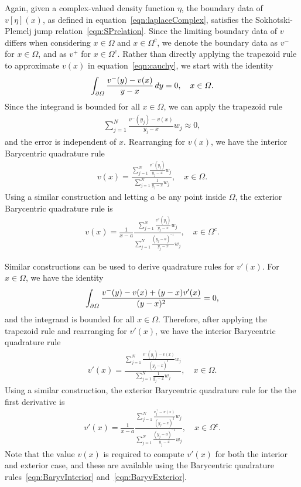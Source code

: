 \documentclass{jfm}
\begin{document}
Again, given a complex-valued density function $\eta$, the boundary data
of $v[\eta](x)$, as defined in equation~\eqref{eqn:laplaceComplex},
satisfies the Sokhotski-Plemelj jump relation~\eqref{eqn:SPrelation}.
Since the limiting boundary data of $v$ differs when considering $x \in
\Omega$ and $x \in \Omega^c$, we denote the boundary data as $v^-$ for
$x \in \Omega$, and as $v^+$ for $x \in \Omega^c$.  Rather than directly
applying the trapezoid rule to approximate $v(x)$ in
equation~\eqref{eqn:cauchy}, we start with the identity
\begin{align}
  \int_{{\partial}\varOmega} \frac{v^{-}(y) - v(x)}{y - x} \,dy = 0,
    \quad x \in \varOmega.
\end{align}
Since the integrand is bounded for all $x \in \Omega$, we can apply the
trapezoid rule
\begin{align}
  \sum_{j=1}^{N} \frac{v^{-}(y_j) - v(x)}{y_j - x} w_j \approx 0,
\end{align}
and the error is independent of $x$.  Rearranging for $v(x)$, we have
the interior Barycentric quadrature rule
\begin{align}
  v(x) = \frac{\sum\limits_{j=1}^N \frac{v^{-}(y_j)}{y_j - x} w_j}
  {\sum\limits_{j=1}^N \frac{1}{y_j - x} w_j}, \quad x \in \Omega.
  \label{eqn:BaryvInterior}
\end{align}
Using a similar construction and letting $a$ be any point inside
$\Omega$, the exterior Barycentric quadrature rule is
\begin{align}
  v(x) = \frac{1}{x-a} 
    \frac{\sum\limits_{j=1}^N \frac{v^+(y_j)}{y_j - x}w_j}
    {\sum\limits_{j=1}^N \frac{(y_j - a)^{-1}}{y_j - x}w_j},
    \quad x \in \Omega^c.
  \label{eqn:BaryvExterior}
\end{align}

Similar constructions can be used to derive quadrature rules
for $v'(x)$.  For $x \in \Omega$, we have the identity
\begin{align}
  \int_{{\partial}\varOmega} \frac{v^-(y) - v(x) + (y-x)v'(x)}{(y - x)^2} = 0,
\end{align}
and the integrand is bounded for all $x \in \Omega$.  Therefore, after
applying the trapezoid rule and rearranging for $v'(x)$, we have the
interior Barycentric quadrature rule
\begin{align}
  v'(x) = \frac{\sum\limits_{j=1}^{N}
    \frac{v^{-}(y_j) - v(x)}{(y_j-x)^2} w_j}
  {\sum\limits_{j=1}^{N} \frac{1}{y_j-x} w_j}, 
  \quad x \in \Omega.
  \label{eqn:BaryvprimeInterior}
\end{align}
Using a similar construction, the exterior Barycentric quadrature rule
for the the first derivative is
\begin{align}
  v'(x) = \frac{1}{x-a} \frac{\sum\limits_{j=1}^N
    \frac{v^+_j - v(x)}{(y_j - x)^2} w_j}
    {\sum\limits_{j=1}^N \frac{(y_j-a)^{-1}}{y_j - x} w_j},
    \quad x \in \Omega^c.
  \label{eqn:BaryvprimeExterior}
\end{align}
Note that the value $v(x)$ is required to compute $v'(x)$ for both the
interior and exterior case, and these are available using the
Barycentric quadrature rules~\eqref{eqn:BaryvInterior}
and~\eqref{eqn:BaryvExterior}.
\end{document}
